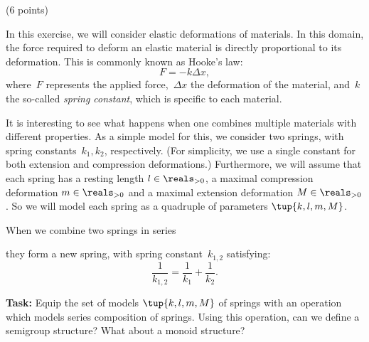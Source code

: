 \documentclass[paper=8.125in:10.250in,pagesize=pdftex,
    headinclude=false,footinclude=false,oneside,egregdoesnotlikesansseriftitles]{kaobook}
\begin{document}
\begin{gradedexercise} (6 points)

%

    In this exercise, we will consider elastic deformations of materials. In this domain, the force required to deform an elastic material is directly proportional to its deformation.
    This is commonly known as Hooke's law:
    \begin{equation*}
        F=-k\Delta x,
    \end{equation*}
    where~$F$ represents the applied force,~$\Delta x$ the deformation of the material, and~$k$ the so-called \emph{spring constant}, which is specific to each material.

    It is interesting to see what happens when one combines multiple materials with different properties.
    As a simple model for this, we consider two springs, with spring constants~$k_1,k_2$, respectively. (For simplicity, we use a single constant for both extension and compression deformations.) Furthermore, we will assume that each spring has a resting length $l \in \reals_{> 0}$, a maximal compression deformation $m \in \reals_{> 0}$ and a maximal extension deformation $M \in \reals_{> 0}$. So we will model each spring as a quadruple of parameters $\tup{k, l, m, M}$. 


 When we combine two springs in series

     \begin{center}
        \end{center}
    they form a new spring, with spring constant~$k_{1,2}$ satisfying:
    \begin{equation*}
        \frac{1}{k_{1,2}}=\frac{1}{k_1}+\frac{1}{k_2}.
    \end{equation*}


\textbf{Task:} Equip the set of models $\tup{k, l, m, M}$ of springs with an operation which models series composition of springs. Using this operation, can we define a semigroup structure? What about a monoid structure?
\end{gradedexercise}

\end{document}

